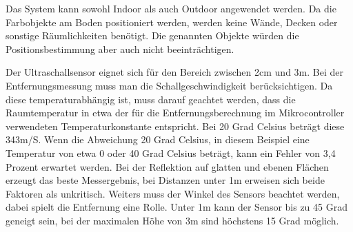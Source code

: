   Das System kann sowohl Indoor als auch Outdoor angewendet werden. Da die Farbobjekte am Boden positioniert werden, werden keine Wände, Decken oder sonstige Räumlichkeiten benötigt. Die genannten Objekte würden die Positionsbestimmung aber auch nicht beeinträchtigen.

  Der Ultraschallsensor eignet sich für den Bereich zwischen 2cm und 3m. Bei der Entfernungsmessung muss man die Schallgeschwindigkeit berücksichtigen. Da diese temperaturabhängig \cite{Ultrasonic} ist, muss darauf geachtet werden, dass die Raumtemperatur in etwa der für die Entfernungsberechnung im Mikrocontroller verwendeten Temperaturkonstante entspricht. Bei 20 Grad Celsius beträgt diese 343m/S. Wenn die Abweichung 20 Grad Celsius, in diesem Beispiel eine Temperatur von etwa 0 oder 40 Grad Celsius beträgt, kann ein Fehler von 3,4 Prozent erwartet werden.
  Bei der Reflektion auf glatten und ebenen Flächen erzeugt das beste Messergebnis, bei Distanzen unter 1m erweisen sich beide Faktoren als unkritisch.
  Weiters muss der Winkel des Sensors beachtet werden, dabei spielt die Entfernung eine Rolle. Unter 1m kann der Sensor bis zu 45 Grad geneigt sein, bei der maximalen Höhe von 3m sind höchstens 15 Grad möglich.
